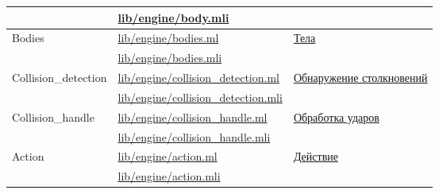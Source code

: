 \begin{centering}
\begin{longtable}{|l|l|l|}
                                                              & \href{https://github.com/prekel/chapgame/blob/master/lib/engine/body.mli}{lib/engine/body.mli}                                 &                                                                                 \\ \hline
        \multirow{2}{*}{Bodies}                               & \href{https://github.com/prekel/chapgame/blob/master/lib/engine/bodies.ml}{lib/engine/bodies.ml}                               & \multirow{2}{*}{\hyperref[bodydescr]{Тела}}                                     \\*
                                                              & \href{https://github.com/prekel/chapgame/blob/master/lib/engine/bodies.mli}{lib/engine/bodies.mli}                             &                                                                                 \\ \hline
        \multirow{2}{*}{Collision\_detection}                 & \href{https://github.com/prekel/chapgame/blob/master/lib/engine/collision\_detection.ml}{lib/engine/collision\_detection.ml}   & \multirow{2}{2cm}{\hyperref[collisiondetectiondescr]{Обнаружение столкновений}} \\*
                                                              & \href{https://github.com/prekel/chapgame/blob/master/lib/engine/collision\_detection.mli}{lib/engine/collision\_detection.mli} &                                                                                 \\ \hline
        \multirow{2}{*}{Collision\_handle}                    & \href{https://github.com/prekel/chapgame/blob/master/lib/engine/collision\_handle.ml}{lib/engine/collision\_handle.ml}         & \multirow{2}{*}{\hyperref[collisionhandledescr]{Обработка ударов}}              \\*
                                                              & \href{https://github.com/prekel/chapgame/blob/master/lib/engine/collision\_handle.mli}{lib/engine/collision\_handle.mli}       &                                                                                 \\ \hline
        \multirow{2}{*}{Action}                               & \href{https://github.com/prekel/chapgame/blob/master/lib/engine/action.ml}{lib/engine/action.ml}                               & \multirow{2}{*}{\hyperref[actiondescr]{Действие}}                               \\*
                                                              & \href{https://github.com/prekel/chapgame/blob/master/lib/engine/action.mli}{lib/engine/action.mli}                             &                                                                                 \\ \hline

\end{longtable}
\end{centering}
